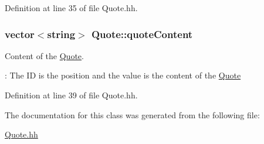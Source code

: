 Definition at line 35 of file Quote.\-hh.

\hypertarget{class_quote_a0ffcb584920e14d7dd5c45820997f989}{
\subsubsection[{quote\-Content}]{\setlength{\rightskip}{0pt plus 5cm}vector$<$string$>$ Quote\-::quote\-Content\hspace{0.3cm}{\ttfamily [private]}}}\label{class_quote_a0ffcb584920e14d7dd5c45820997f989}


Content of the \hyperlink{class_quote}{Quote}. 

\-: The I\-D is the position and the value is the content of the \hyperlink{class_quote}{Quote} 

Definition at line 39 of file Quote.\-hh.



The documentation for this class was generated from the following file\-:\begin{DoxyCompactItemize}
\item 
\hyperlink{_quote_8hh}{Quote.\-hh}\end{DoxyCompactItemize}
